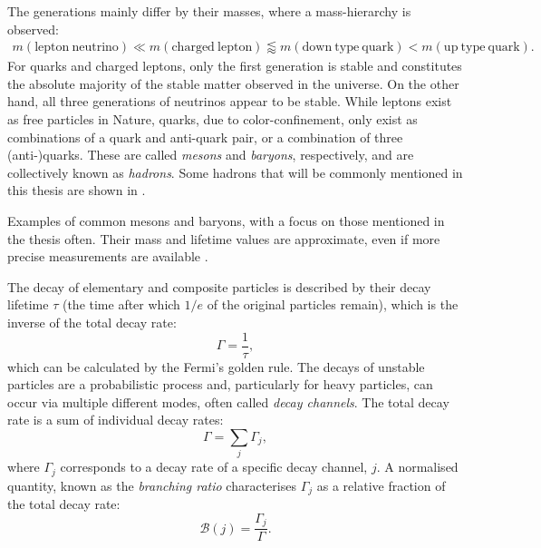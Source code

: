 The generations mainly differ by their masses, where a mass-hierarchy is observed: 
\begin{align*}
    m(\mathrm{lepton~neutrino})\ll m(\mathrm{charged~lepton})\lessapprox m(\mathrm{down~type~quark})<m(\mathrm{up~type~quark}).
\end{align*}
For quarks and charged leptons, only the first generation is stable and constitutes the absolute majority of the stable matter observed in the universe.
On the other hand, all three generations of neutrinos appear to be stable.
While leptons exist as free particles in Nature, quarks, due to color-confinement, 
only exist as combinations of a quark and anti-quark pair, or a combination of three (anti-)quarks.
These are called \textit{mesons} and \textit{baryons}, respectively, and are collectively known as \textit{hadrons}.
Some hadrons that will be commonly mentioned in this thesis are shown in .
\begin{table}[htbp!]
    \centering
    \caption{\label{tab:hadrons}
    Examples of common mesons and baryons, with a focus on those mentioned in the thesis often.
    Their mass and lifetime values are approximate, even if more precise measurements are available \cite{Workman:2022ynf}.
    }
    
\end{table}

The decay of elementary and composite particles is described by their decay lifetime $\tau$ (the time after which $1/e$ of the original particles remain), 
which is the inverse of the total decay rate:
\begin{equation}
    \Gamma = \frac{1}{\tau},
\end{equation}
which can be calculated by the Fermi's golden rule.
The decays of unstable particles are a probabilistic process and, particularly for heavy particles, can occur via multiple different modes, often called \textit{decay channels}.
The total decay rate is a sum of individual decay rates:
\begin{equation}
    \Gamma = \sum_j\Gamma_j,
\end{equation}
where $\Gamma_j$ corresponds to a decay rate of a specific decay channel, $j$.
A normalised quantity, known as the \textit{branching ratio} characterises $\Gamma_j$ as a relative fraction of the total decay rate:
\begin{equation}\label{eq:branching_fraction_definition}
    \mathcal{B}(j) = \frac{\Gamma_j}{\Gamma}.
\end{equation}

